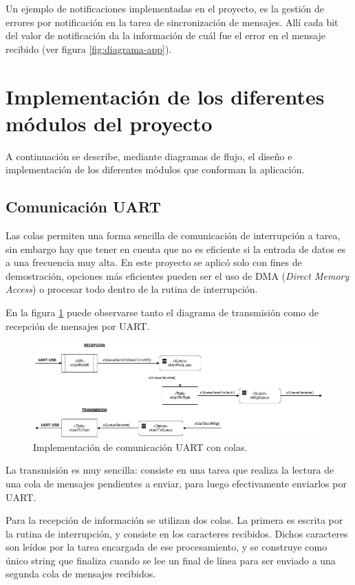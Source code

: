 \documentclass{IEEEtran}
\begin{document}
Un ejemplo de notificaciones implementadas en el proyecto, es la gestión de errores por notificación en la tarea de sincronización de mensajes. Allí cada bit del valor de notificación da la información de cuál fue el error en el mensaje recibido (ver figura \ref{fig:diagrama-app}).

\section{Implementación de los diferentes módulos del proyecto}
\label{sec:modulos}

A continuación se describe, mediante diagramas de flujo, el diseño e implementación de los diferentes módulos que conforman la aplicación.

\subsection{Comunicación UART}
\label{sec:uart}
Las colas permiten una forma sencilla de comunicación de interrupción a tarea, sin embargo hay que tener en cuenta que no es eficiente si la entrada de datos es a una frecuencia muy alta. En este proyecto se aplicó solo con fines de demostración, opciones más eficientes pueden ser el uso de DMA (\textit{Direct Memory Access}) o procesar todo dentro de la rutina de interrupción.

En la figura \ref{fig:diagrama-uart} puede observarse tanto el diagrama de transmisión como de recepción de mensajes por UART.

\begin{figure}[ht]
    \centering
    \includegraphics[scale=0.5]{../diagrama_uart.png}
    \caption{Implementación de comunicación UART con colas.}
    \label{fig:diagrama-uart}
\end{figure}

La transmisión es muy sencilla: consiste en una tarea que realiza la lectura de una cola de mensajes pendientes a enviar, para luego efectivamente enviarlos por UART.

Para la recepción de información se utilizan dos colas. La primera es escrita por la rutina de interrupción, y consiste en los caracteres recibidos. Dichos caracteres son leídos por la tarea encargada de ese procesamiento, y se construye como único string que finaliza cuando se lee un final de línea para ser enviado a una segunda cola de mensajes recibidos.
\end{document}
